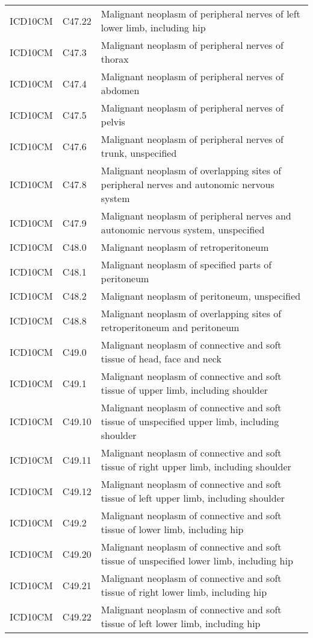 \begin{table}[ht]
\begin{tabular}{lll}
  ICD10CM & C47.22 & Malignant neoplasm of peripheral nerves of left lower limb, including hip \\ 
  ICD10CM & C47.3 & Malignant neoplasm of peripheral nerves of thorax \\ 
  ICD10CM & C47.4 & Malignant neoplasm of peripheral nerves of abdomen \\ 
  ICD10CM & C47.5 & Malignant neoplasm of peripheral nerves of pelvis \\ 
  ICD10CM & C47.6 & Malignant neoplasm of peripheral nerves of trunk, unspecified \\ 
  ICD10CM & C47.8 & Malignant neoplasm of overlapping sites of peripheral nerves and autonomic nervous system \\ 
  ICD10CM & C47.9 & Malignant neoplasm of peripheral nerves and autonomic nervous system, unspecified \\ 
  ICD10CM & C48.0 & Malignant neoplasm of retroperitoneum \\ 
  ICD10CM & C48.1 & Malignant neoplasm of specified parts of peritoneum \\ 
  ICD10CM & C48.2 & Malignant neoplasm of peritoneum, unspecified \\ 
  ICD10CM & C48.8 & Malignant neoplasm of overlapping sites of retroperitoneum and peritoneum \\ 
  ICD10CM & C49.0 & Malignant neoplasm of connective and soft tissue of head, face and neck \\ 
  ICD10CM & C49.1 & Malignant neoplasm of connective and soft tissue of upper limb, including shoulder \\ 
  ICD10CM & C49.10 & Malignant neoplasm of connective and soft tissue of unspecified upper limb, including shoulder \\ 
  ICD10CM & C49.11 & Malignant neoplasm of connective and soft tissue of right upper limb, including shoulder \\ 
  ICD10CM & C49.12 & Malignant neoplasm of connective and soft tissue of left upper limb, including shoulder \\ 
  ICD10CM & C49.2 & Malignant neoplasm of connective and soft tissue of lower limb, including hip \\ 
  ICD10CM & C49.20 & Malignant neoplasm of connective and soft tissue of unspecified lower limb, including hip \\ 
  ICD10CM & C49.21 & Malignant neoplasm of connective and soft tissue of right lower limb, including hip \\ 
  ICD10CM & C49.22 & Malignant neoplasm of connective and soft tissue of left lower limb, including hip \\ 

\end{tabular}
\end{table}
